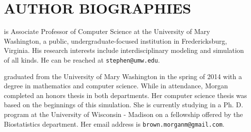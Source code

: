 \section*{AUTHOR BIOGRAPHIES}

 is Associate Professor of Computer Science at
the University of Mary Washington, a public, undergraduate-focused institution
in Fredericksburg, Virginia. His research interests include interdisciplinary
modeling and simulation of all kinds. He can be reached at
\texttt{stephen@umw.edu}.

\vspace{.1in}

 graduated from the University of Mary Washington
in the spring of 2014 with a degree in mathematics and computer science. While
in attendance, Morgan completed an honors thesis in both departments. Her
computer science thesis was based on the beginnings of this simulation. She is
currently studying in a Ph. D. program at the University of Wisconsin -
Madison on a fellowship offered by the Biostatistics department. Her email
address is \texttt{brown.morganm@gmail.com}.

